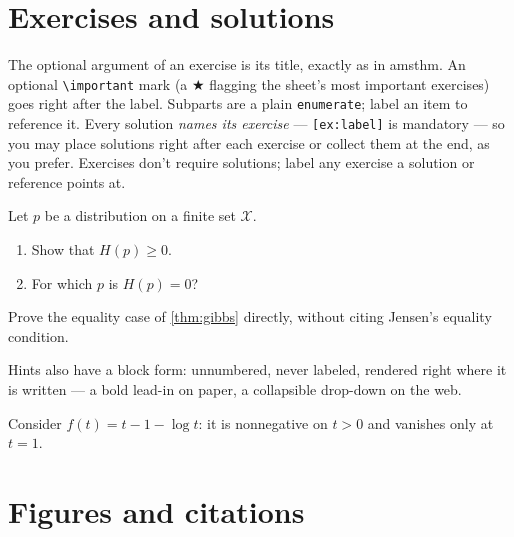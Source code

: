 \documentclass[11pt]{article}
\begin{document}
\section{Exercises and solutions}
\label{sec:exercises}

The optional argument of an exercise is its title, exactly as in amsthm.
An optional \verb|\important| mark (a $\bigstar$ flagging the sheet's most
important exercises) goes right after the label. Subparts are a plain
\texttt{enumerate}; label an item to reference it. Every solution
\emph{names its exercise} — \texttt{[ex:label]} is mandatory — so you may
place solutions right after each exercise or collect them at the end, as you
prefer. Exercises don't require solutions; label any exercise a solution or
reference points at.

\begin{exercise}
\label{ex:warmup}
Let $p$ be a distribution on a finite set $\mathcal{X}$.
\begin{enumerate}
  \item Show that $H(p) \geq 0$.
        \label{ex:warmup-a}
  \item For which $p$ is $H(p) = 0$?
\end{enumerate}
\end{exercise}


\begin{exercise}
\label{ex:gibbs-hard}
\important
Prove the equality case of \cref{thm:gibbs} directly, without citing Jensen's
equality condition. 
\end{exercise}

Hints also have a block form: unnumbered, never labeled, rendered right where
it is written — a bold lead-in on paper, a collapsible drop-down on the web.

\begin{hint}
Consider $f(t) = t - 1 - \log t$: it is nonnegative on $t > 0$ and vanishes
only at $t = 1$.
\end{hint}

\section{Figures and citations}
\label{sec:figures}
\end{document}

